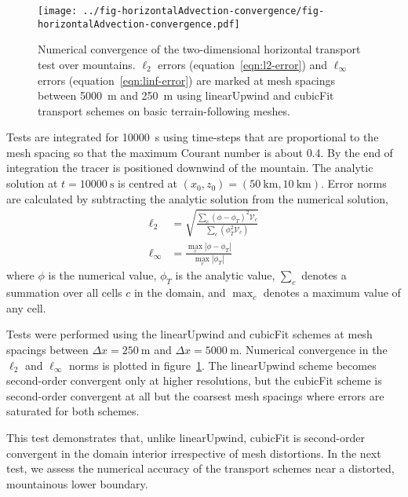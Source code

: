 \begin{figure}
	\centering
	\texttt{[image: ../fig-horizontalAdvection-convergence/fig-horizontalAdvection-convergence.pdf]}
%
	\caption{Numerical convergence of the two-dimensional horizontal transport test over mountains.  $\ell_2$ errors (equation~\ref{eqn:l2-error}) and $\ell_\infty$ errors (equation~\ref{eqn:linf-error}) are marked at mesh spacings between \SI{5000}{\meter} and \SI{250}{\meter} using linearUpwind and cubicFit transport schemes on basic terrain-following meshes. }
	\label{fig:horizontalAdvection-convergence}
\end{figure}

Tests are integrated for \SI{10000}{\second} using time-steps that are proportional to the mesh spacing so that the maximum Courant number is about \num{0.4}.  By the end of integration the tracer is positioned downwind of the mountain.
The analytic solution at $t = \SI{10000}{\second}$ is centred at $(x_0, z_0) = (\SI{50}{\kilo\meter}, \SI{10}{\kilo\meter})$.  Error norms are calculated by subtracting the analytic solution from the numerical solution,
\begin{align}
	\ell_2 &= \sqrt{\frac{\sum_c \left(\phi - \phi_T \right)^2 \mathcal{V}_c}{\sum_c \left(\phi_T^2 \mathcal{V}_c \right)}} \label{eqn:l2-error} \\
	\ell_\infty &= \frac{\max_c |\phi - \phi_T|}{\max_c |\phi_T|} \label{eqn:linf-error}
\end{align}
where $\phi$ is the numerical value, $\phi_T$ is the analytic value, $\sum_c$ denotes a summation over all cells $c$ in the domain, and $\max_c$ denotes a maximum value of any cell.

Tests were performed using the linearUpwind and cubicFit schemes at mesh spacings between $\Delta x = \SI{250}{\meter}$ and $\Delta x = \SI{5000}{\meter}$.
Numerical convergence in the $\ell_2$ and $\ell_\infty$ norms is plotted in figure~\ref{fig:horizontalAdvection-convergence}.
The linearUpwind scheme becomes second-order convergent only at higher resolutions, but the cubicFit scheme is second-order convergent at all but the coarsest mesh spacings where errors are saturated for both schemes.

This test demonstrates that, unlike linearUpwind, cubicFit is second-order convergent in the domain interior irrespective of mesh distortions.  In the next test, we assess the numerical accuracy of the transport schemes near a distorted, mountainous lower boundary.

